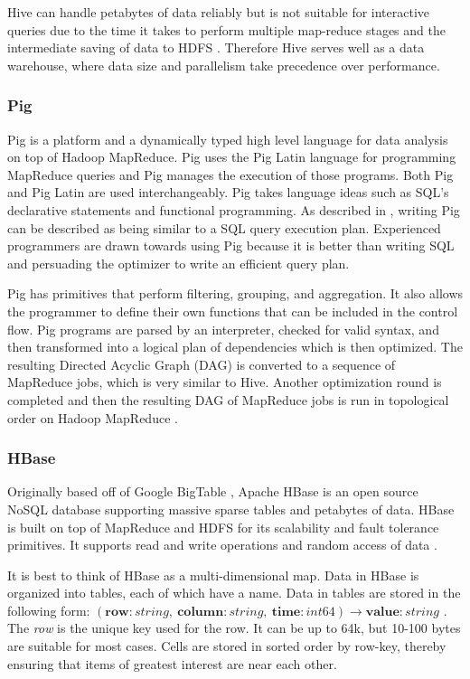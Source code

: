 \documentclass[12pt]{article}
\begin{document}
Hive can handle petabytes of data reliably but is not suitable for interactive queries due to the time it takes to perform multiple map-reduce stages and the intermediate saving of data to HDFS \cite{zhang2016survey}. Therefore Hive serves well as a data warehouse, where data size and parallelism take precedence over performance.


\subsubsection{Pig}

Pig \cite{pig} is a platform and a dynamically typed high level language for data analysis on top of Hadoop MapReduce. Pig uses the Pig Latin \cite{piglatin} language for programming MapReduce queries and Pig manages the execution of those programs. Both Pig and Pig Latin are used interchangeably. Pig takes language ideas such as SQL's declarative statements and functional programming. As described in \cite{sakr2013hadoop}, writing Pig can be described as being similar to a SQL query execution plan. Experienced programmers are drawn towards using Pig because it is better than writing SQL and persuading the optimizer to write an efficient query plan.

Pig has primitives that perform filtering, grouping, and aggregation. It also allows the programmer to define their own functions that can be included in the control flow. Pig programs are parsed by an interpreter, checked for valid syntax, and then transformed into a logical plan of dependencies which is then optimized. The resulting Directed Acyclic Graph (DAG) is converted to a sequence of MapReduce jobs, which is very similar to Hive. Another optimization round is completed and then the resulting DAG of MapReduce jobs is run in topological order on Hadoop MapReduce \cite{sakr2013hadoop,polato2014hadoop}.


\subsubsection{HBase}

Originally based off of Google BigTable \cite{chang2008bigtable}, Apache HBase is an open source NoSQL database supporting massive sparse tables and petabytes of data. HBase is built on top of MapReduce and HDFS for its scalability and fault tolerance primitives. It supports read and write operations and random access of data \cite{hbaseanalysis}.

It is best to think of HBase as a multi-dimensional map. Data in HBase is organized into tables, each of which have a name. Data in tables are stored in the following form: $(\mathbf{row}:string, \ \mathbf{column}:string, \ \mathbf{time}:int64) \rightarrow \mathbf{value}:string$ \cite{chang2008bigtable,hbasedocs}. The \textit{row} is the unique key used for the row. It can be up to 64k, but 10-100 bytes are suitable for most cases. Cells are stored in sorted order by row-key, thereby ensuring that items of greatest interest are near each other.
\end{document}
